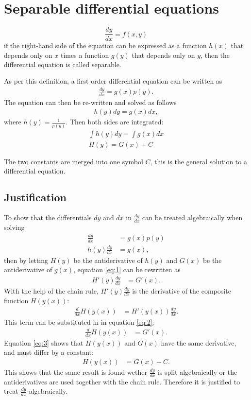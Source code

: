 \section{Separable differential equations} \label{SDE}
\begin{tcolorbox}[colback=blue!5!white,colframe=blue!75!black,title=Definition: Separable equation] 
    $$\frac{dy}{dx} = f(x,y)$$
    if the right-hand side of the equation can be expressed as   a function $h(x)$ that depends only on $x$ times a function $g(y)$ that depends only on $y$, then the differential equation is called separable.
   \end{tcolorbox}
As per this definition, a first order differential equation can be written as
\begin{align}
	\frac{dy}{dx}=g(x)p(y).
\end{align}
The equation can then be re-written and solved as follows
\begin{align}
	h(y)dy=g(x)dx,
\end{align}
where $h(y) = \frac{1}{p(y)}$. Then both sides are integrated:
 \begin{align}
 	\int h(y)dy =\int g(x)dx   \\
 	H(y)=G(x)+C
 \end{align}
 
The two constants are merged into one symbol $C$, this is the general solution to a differential equation. \citep{diffandcomplex}

\subsection{Justification} 
To show that the differentials $dy$ and $dx$ in $\frac{dy}{dx}$ can be treated algebraically when solving 
 \begin{align}
	\frac{dy}{dx} &= g(x)p(y)\nonumber\\
	h(y)\frac{dy}{dx} &= g(x)\label{eq:1},
 \end{align}
then by letting $H(y)$ be the antiderivative of $h(y)$ and $G(x)$ be the antiderivative of $g(x)$, equation \ref{eq:1} can be rewritten as 
 \begin{align}
 	H'(y)\frac{dy}{dx} &= G'(x)\label{eq:2}.
 \end{align}
With the help of the chain rule, $H'(y)\frac{dy}{dx}$ is the derivative of the composite function $H(y(x))$:
 \begin{align*}
	\frac{d}{dx} H(y(x)) &= H'(y(x))\frac{dy}{dx}.
 \end{align*}
This term can be substituted in in equation \ref{eq:2}:
 \begin{align}
 	\frac{d}{dx}H(y(x)) &= G'(x)\label{eq:3}.
 \end{align}
Equation \ref{eq:3} shows that $H(y(x))$ and $G(x)$ have the same derivative, and must differ by a constant:
 \begin{align*}
 	H(y(x)) &= G(x) + C.
 \end{align*}
This shows that the same result is found wether $\frac{dy}{dx}$ is split algebraically or the antiderivatives are used together with the chain rule. Therefore it is justified to treat $\frac{dy}{dx}$ algebraically.

